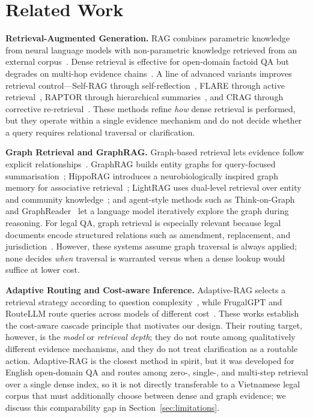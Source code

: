 \section{Related Work}\label{sec:related_work}

\noindent\textbf{Retrieval-Augmented Generation.}
RAG combines parametric knowledge from neural language models with
non-parametric knowledge retrieved from an external
corpus~\cite{lewis2020rag,guu2020realm}. Dense retrieval is effective for
open-domain factoid QA but degrades on multi-hop evidence
chains~\cite{karpukhin2020dpr,trivedi2023interleaving}. A line of advanced
variants improves retrieval control---Self-RAG through
self-reflection~\cite{asai2023selfrag}, FLARE through active
retrieval~\cite{jiang2023flare}, RAPTOR through hierarchical
summaries~\cite{sarthi2024raptor}, and CRAG through corrective
re-retrieval~\cite{yan2024corrective}. These methods refine \emph{how} dense
retrieval is performed, but they operate within a single evidence mechanism
and do not decide whether a query requires relational traversal or
clarification.

\noindent\textbf{Graph Retrieval and GraphRAG.}
Graph-based retrieval lets evidence follow explicit
relationships~\cite{sun2019pullnet,wang2024kgp}. GraphRAG builds entity
graphs for query-focused summarisation~\cite{edge2024graphrag}; HippoRAG
introduces a neurobiologically inspired graph memory for associative
retrieval~\cite{gutierrez2024hipporag}; LightRAG uses dual-level retrieval
over entity and community knowledge~\cite{he2024lightrag}; and
agent-style methods such as Think-on-Graph~\cite{sun2024thinkongraph} and
GraphReader~\cite{li2024graphreader} let a language model iteratively explore
the graph during reasoning. For legal QA, graph retrieval is especially
relevant because legal documents encode structured relations such as
amendment, replacement, and jurisdiction~\cite{sovrano2020legalkg}. However,
these systems assume graph traversal is always applied; none decides
\emph{when} traversal is warranted versus when a dense lookup would suffice at
lower cost.

\noindent\textbf{Adaptive Routing and Cost-aware Inference.}
Adaptive-RAG selects a retrieval strategy according to question
complexity~\cite{jeong2024adaptive}, while FrugalGPT and RouteLLM route
queries across models of different
cost~\cite{chen2023frugalgpt,ong2024routellm}. These works establish the
cost-aware cascade principle that motivates our design. Their routing target,
however, is the \emph{model} or \emph{retrieval depth}; they do not route
among qualitatively different evidence mechanisms, and they do not treat
clarification as a routable action. Adaptive-RAG is the closest method in
spirit, but it was developed for English open-domain QA and routes among
zero-, single-, and multi-step retrieval over a single dense index, so it is
not directly transferable to a Vietnamese legal corpus that must additionally
choose between dense and graph evidence; we discuss this comparability gap in
Section~\ref{sec:limitations}.

